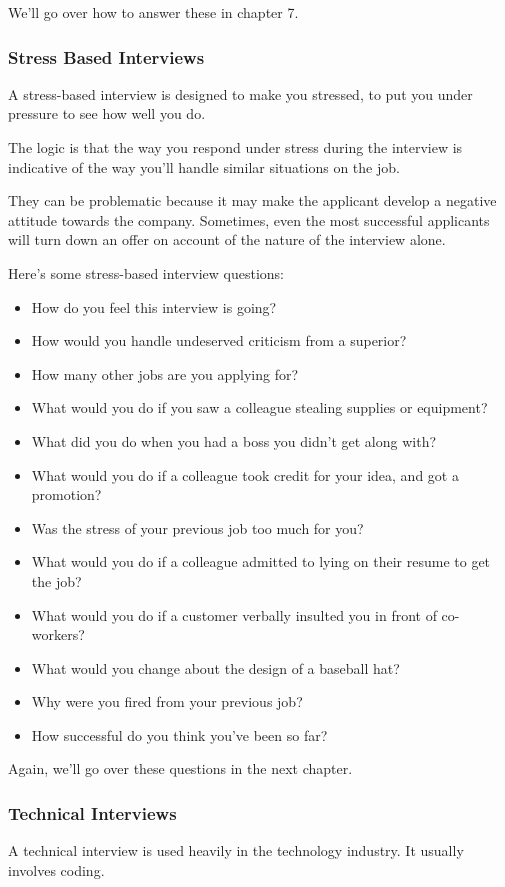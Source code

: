 \documentclass{article}
\begin{document}
We'll go over how to answer these in chapter 7.
\subsubsection{Stress Based Interviews}
A stress-based interview is designed to make you stressed, to put you
under pressure to see how well you do.

The logic is that the way you respond under stress during the interview
is indicative of the way you'll handle similar situations on the job.

They can be problematic because it may make the applicant develop a
negative attitude towards the company. Sometimes, even the most
successful applicants will turn down an offer on account of the nature
of the interview alone.

Here's some stress-based interview questions:
\begin{itemize}
\item
  How do you feel this interview is going?
\item
  How would you handle undeserved criticism from a superior?
\item
  How many other jobs are you applying for?
\item
  What would you do if you saw a colleague stealing supplies or
  equipment?
\item
  What did you do when you had a boss you didn't get along with?
\item
  What would you do if a colleague took credit for your idea, and got a
  promotion?
\item
  Was the stress of your previous job too much for you?
\item
  What would you do if a colleague admitted to lying on their resume to
  get the job?
\item
  What would you do if a customer verbally insulted you in front of
  co-workers?
\item
  What would you change about the design of a baseball hat?
\item
  Why were you fired from your previous job?
\item
  How successful do you think you've been so far?
\end{itemize}

Again, we'll go over these questions in the next chapter.
\subsubsection{Technical Interviews}
A technical interview is used heavily in the technology industry. It
usually involves coding.
\end{document}
